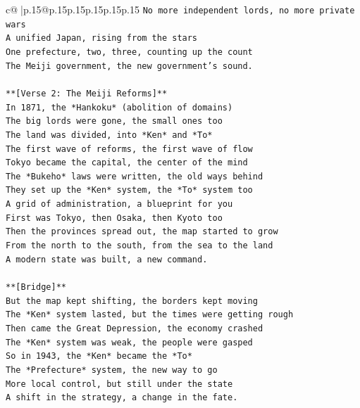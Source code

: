 \documentclass{article}
\begin{document}
{\begin{supertabular}{c@{$\;$}|p{.15\linewidth}@{}p{.15\linewidth}p{.15\linewidth}p{.15\linewidth}p{.15\linewidth}p{.15\linewidth}}
{{{\texttt{No more independent lords, no more private wars} \\
\texttt{A unified Japan, rising from the stars} \\
\texttt{One prefecture, two, three, counting up the count} \\
\texttt{The Meiji government, the new government's sound.} \\
\\ 
\texttt{**{[}Verse 2: The Meiji Reforms{]}**} \\
\texttt{In 1871, the *Hankoku* (abolition of domains)} \\
\texttt{The big lords were gone, the small ones too} \\
\texttt{The land was divided, into *Ken* and *To*} \\
\texttt{The first wave of reforms, the first wave of flow} \\
\texttt{Tokyo became the capital, the center of the mind} \\
\texttt{The *Bukeho* laws were written, the old ways behind} \\
\texttt{They set up the *Ken* system, the *To* system too} \\
\texttt{A grid of administration, a blueprint for you} \\
\texttt{First was Tokyo, then Osaka, then Kyoto too} \\
\texttt{Then the provinces spread out, the map started to grow} \\
\texttt{From the north to the south, from the sea to the land} \\
\texttt{A modern state was built, a new command.} \\
\\ 
\texttt{**{[}Bridge{]}**} \\
\texttt{But the map kept shifting, the borders kept moving} \\
\texttt{The *Ken* system lasted, but the times were getting rough} \\
\texttt{Then came the Great Depression, the economy crashed} \\
\texttt{The *Ken* system was weak, the people were gasped} \\
\texttt{So in 1943, the *Ken* became the *To*} \\
\texttt{The *Prefecture* system, the new way to go} \\
\texttt{More local control, but still under the state} \\
\texttt{A shift in the strategy, a change in the fate.} \\
}}}
\end{supertabular}}
\end{document}
